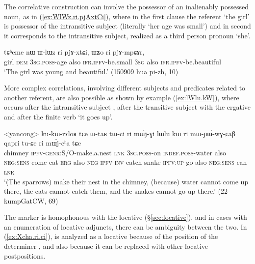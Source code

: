 The correlative construction can involve the possessor of an inalienably possessed noun, as in (\ref{ex:WlWz.ri.pjAxtCi}), where in the first clause the referent `the girl' is possessor of the intransitive subject (literally `her age was small') and in second it corresponds to the intransitive subject, realized as a third person pronoun  `she'.

  \begin{exe}
\ex \label{ex:WlWz.ri.pjAxtCi}
 \gll tɕʰeme nɯ ɯ-lɯz ri pjɤ-xtɕi, ɯʑo ri pjɤ-mpɕɤr,  \\
 girl \textsc{dem} \textsc{3sg}.\textsc{poss}-age also \textsc{ifr}.\textsc{ipfv}-be.small \textsc{3sg} also \textsc{ifr}.\textsc{ipfv}-be.beautiful \\
\glt `The girl was young and beautiful.' (150909 hua pi-zh, 10)
 \end{exe}
 
 More complex correlations, involving different subjects and predicates related to another referent, are also possible as shown by example (\ref{ex:lWlu.kW}), where  occurs after the intransitive subject , after the transitive subject  with the ergative and after the finite verb  `it goes up'.
 
 \begin{exe}
\ex   \label{ex:lWlu.kW}
\gll <yancong> ku-kɯ-rɤloʁ tɕe ɯ-taʁ tɯ-ci ri mɯ́j-ɣi lɯlu kɯ ri mɯ-ɲɯ́-wɣ-ɕaβ qapri tu-ɕe ri mɯ́j-cʰa tɕe \\
 chimney \textsc{ipfv}-\textsc{genr}:S/O-make.a.nest \textsc{lnk} \textsc{3sg}.\textsc{poss}-on \textsc{indef}.\textsc{poss}-water also \textsc{neg}:\textsc{sens}-come cat \textsc{erg} also \textsc{neg}-\textsc{ipfv}-\textsc{inv}-catch snake \textsc{ipfv}:\textsc{up}-go also \textsc{neg}:\textsc{sens}-can \textsc{lnk} \\
 \glt `(The sparrows) make their nest in the chimney, (because) water cannot come up there, the cats cannot catch them, and the snakes cannot go up there.' (22-kumpGatCW, 69)
 \end{exe} 
 
 The marker  is homophonous with the locative  (§\ref{sec:locative}), and in cases with an enumeration of locative adjuncts, there can be ambiguity between the two. In (\ref{ex:Xcha.ri.ci}),  is analyzed as a locative because of the position of the determiner , and also because it can be replaced with other locative postpositions.
 
